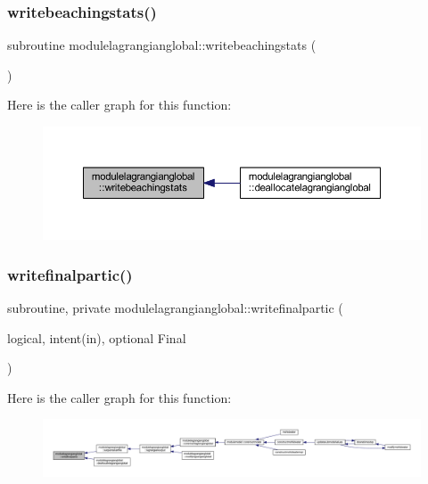 \subsubsection{\texorpdfstring{writebeachingstats()}{writebeachingstats()}}
{\footnotesize\ttfamily subroutine modulelagrangianglobal\+::writebeachingstats (\begin{DoxyParamCaption}{ }\end{DoxyParamCaption})\hspace{0.3cm}{\ttfamily [private]}}

Here is the caller graph for this function\+:\nopagebreak
\begin{figure}[H]
\begin{center}
\leavevmode
\includegraphics[width=350pt]{namespacemodulelagrangianglobal_ab5538aa3df9f78e442a96f940f3d160f_icgraph}
\end{center}
\end{figure}
\mbox{\label{namespacemodulelagrangianglobal_a2bf7986f317831603f4eb96d616f643e}} 
\subsubsection{\texorpdfstring{writefinalpartic()}{writefinalpartic()}}
{\footnotesize\ttfamily subroutine, private modulelagrangianglobal\+::writefinalpartic (\begin{DoxyParamCaption}\item[{logical, intent(in), optional}]{Final }\end{DoxyParamCaption})\hspace{0.3cm}{\ttfamily [private]}}

Here is the caller graph for this function\+:\nopagebreak
\begin{figure}[H]
\begin{center}
\leavevmode
\includegraphics[width=350pt]{namespacemodulelagrangianglobal_a2bf7986f317831603f4eb96d616f643e_icgraph}
\end{center}
\end{figure}
\mbox{\label{namespacemodulelagrangianglobal_a091fa515c0c76fbe52d2c31ad026151d}} 
